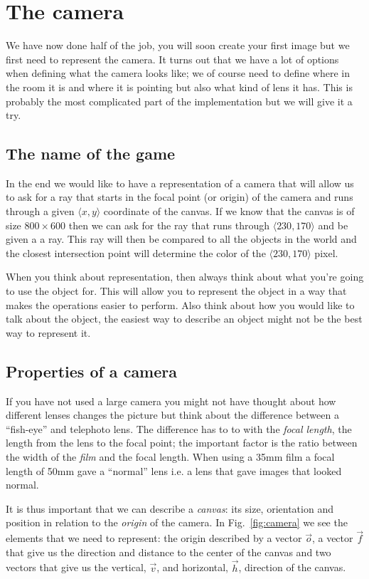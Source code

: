\documentclass[a4paper,11pt]{article}
\begin{document}
\section{The camera}

We have now done half of the job, you will soon create your first
image but we first need to represent the camera. It turns out that we
have a lot of options when defining what the camera looks like; we of
course need to define where in the room it is and where it is pointing
but also what kind of lens it has. This is probably the most
complicated part of the implementation but we will give it a try.

\subsection*{The name of the game}
In the end we would like to have a representation of a camera that
will allow us to ask for a ray that starts in the focal point (or
origin) of the camera and runs through a given $\langle x, y\rangle$
coordinate of the canvas. If we know that the canvas is of size
$800 \times 600$
then we can ask for the ray that runs through
$\langle 230, 170\rangle$
and be given a a ray. This ray will then be compared to all the
objects in the world and the closest intersection point will determine
the color of the $\langle 230, 170\rangle$ pixel.

When you think about representation, then always think about what
you're going to use the object for. This will allow you to represent
the object in a way that makes the operations easier to perform. Also
think about how you would like to talk about the object, the easiest
way to describe an object might not be the best way to represent it.

\subsection*{Properties of a camera}
If you have not used a large camera you might not have thought about
how different lenses changes the picture but think about the
difference between a ``fish-eye'' and telephoto lens. The difference
has to to with the {\em focal length}, the length from the lens to the
focal point; the important factor is the ratio between the width of
the {\em film} and the focal length. When using a 35mm film a focal
length of 50mm gave a ``normal'' lens i.e. a lens that gave images
that looked normal.

It is thus important that we can describe a {\em canvas}: its size,
orientation and position in relation to the {\em origin} of the
camera. In Fig.~\ref{fig:camera} we see the elements that we need to
represent: the origin described by a vector $\vec{o}$,
a vector $\vec{f}$
that give us the direction and distance to the center of the canvas
and two vectors that give us the vertical, $\vec{v}$,
and horizontal, $\vec{h}$,
direction of the canvas. 
\end{document}
